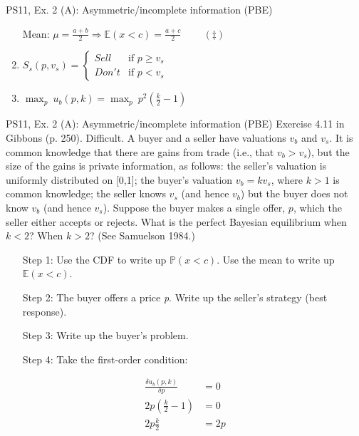 \begin{frame}{PS11, Ex. 2 (A): Asymmetric/incomplete information (PBE)}
\begin{multicols}{2}
\begin{enumerate}
        \item[Mean:] $\mu=\frac{a+b}{2}\Rightarrow\mathbb{E}(x<c)=\frac{a+c}{2}\quad\quad\ (\ddagger)$
        \item $S_s(p,v_s)=\left\{\begin{array}{ll}
          Sell  & \text{if }p\geq v_s \\
          Don't & \text{if }p < v_s
        \end{array}\right.$
        \item $\displaystyle{\max_p}\ u_b(p,k)=\displaystyle{\max_p}\ p^2\left(\frac{k}{2}-1\right)$
      \end{enumerate}
      \vfill\null
    \end{multicols}
\end{frame}
\begin{frame}{PS11, Ex. 2 (A): Asymmetric/incomplete information (PBE)}
    Exercise 4.11 in Gibbons (p. 250). Difficult. A buyer and a seller have valuations $v_b$ and $v_s$. It is common knowledge that there are gains from trade (i.e., that $v_b > v_s$), but the size of the gains is private information, as follows: the seller’s valuation is uniformly distributed on [0,1]; the buyer’s valuation $v_b = kv_s$, where $k > 1$ is common knowledge; the seller knows $v_s$ (and hence $v_b$) but the buyer does not know $v_b$ (and hence $v_s$). Suppose the buyer makes a single offer, $p$, which the seller either accepts or rejects. What is the perfect Bayesian equilibrium when $k < 2$? When $k > 2$? (See Samuelson 1984.) \vspace{-8pt}
    \begin{multicols}{2}
      \begin{itemize}
        \item[Step 1:] Use the CDF to write up $\mathbb{P}(x<c)$. Use the mean to write up $\mathbb{E}(x<c)$.
        \item[Step 2:] The buyer offers a price \textit{p}. Write up the seller's strategy (best response).
        \item[Step 3:] Write up the buyer's problem.
        \item[Step 4:] Take the first-order condition:
      \end{itemize} \vspace{-8pt}
      \begin{align*}
        \frac{\delta u_b(p,k)}{\delta p}&=0\\
        2p\left(\frac{k}{2}-1\right)&=0\\
        2p\frac{k}{2}&=2p\\

\end{align*}
\end{multicols}
\end{frame}
